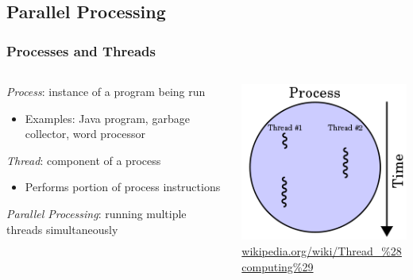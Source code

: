\documentclass{beamer}
\newcommand{\linespace}{\vskip 0.25cm}
\begin{document}
\subsection[PP Basics]{Parallel Processing}

\begin{frame}

\frametitle{Processes and Threads}

\begin{columns}
\begin{column}{0.7\textwidth}

\emph{Process}: instance of a program being run
\begin{itemize}
\item Examples: Java program, garbage collector, word processor
\end{itemize}

\linespace
\linespace

\emph{Thread}: component of a process
\begin{itemize}
\item Performs portion of process instructions %
\end{itemize}

\linespace
\linespace

\emph{Parallel Processing}: running multiple threads simultaneously

\end{column}

\begin{column}{0.30\textwidth}

\begin{center}
\includegraphics[width=1.0\textwidth]{Illustrations/multithreading.png} \\
{\small \url{wikipedia.org/wiki/Thread_\%28computing\%29}}
\end{center}

\end{column}
\end{columns}

\end{frame}
\end{document}
